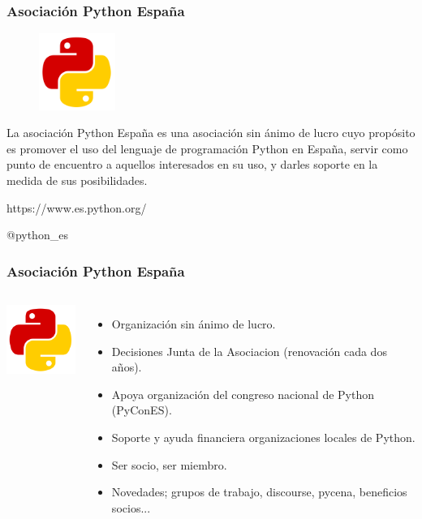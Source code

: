 \documentclass[18pt]{beamer}
\begin{document}
\begin{frame}

	\frametitle{Asociación Python España}
	
	\begin{figure}
		\includegraphics[width=2.5cm]{images/python_spain.png}
	\end{figure}
	
	La asociación Python España es una asociación sin ánimo de lucro cuyo propósito 
	es promover el uso del lenguaje de programación Python en España, servir como 
	punto de encuentro a aquellos interesados en su uso, y darles soporte en la medida 
	de sus posibilidades.

	\vspace{0.3cm}
	\centerline{https://www.es.python.org/}
	
	\vspace{0.4cm}
	\centerline{@python\_es}	
	
\end{frame}


\begin{frame}

	\frametitle{Asociación Python España}
		
	\begin{columns}
		\centering
			\includegraphics[width=2.5cm]{images/python_spain.png}
			
		\begin{itemize}
			\setlength\itemsep{0.6em}		
			\item Organización sin ánimo de lucro.
			\item Decisiones Junta de la Asociacion (renovación cada dos años).
			\item Apoya organización del congreso nacional de Python (PyConES).
			\item Soporte y ayuda financiera organizaciones locales de Python.
			\item Ser socio, ser miembro.
			\item Novedades; grupos de trabajo, discourse, pycena, 
			beneficios socios...  
		\end{itemize}
	\end{columns}
	
\end{frame}
\end{document}

